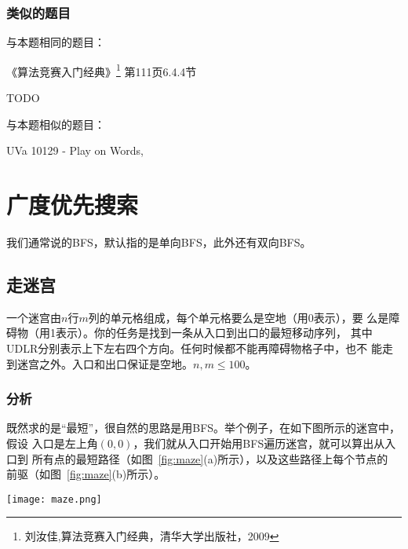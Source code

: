 \subsubsection{类似的题目}
与本题相同的题目：
\begindot
\item 《算法竞赛入门经典》\footnote{刘汝佳,算法竞赛入门经典，清华大学出版社，2009} 第111页6.4.4节
\item  TODO
\myenddot

与本题相似的题目：
\begindot
\item  UVa 10129 - Play on Words, 
\myenddot

\section{广度优先搜索} %

我们通常说的BFS，默认指的是单向BFS，此外还有双向BFS。

\subsection{走迷宫}
一个迷宫由$n$行$m$列的单元格组成，每个单元格要么是空地（用0表示），要
么是障碍物（用1表示）。你的任务是找到一条从入口到出口的最短移动序列，
其中UDLR分别表示上下左右四个方向。任何时候都不能再障碍物格子中，也不
能走到迷宫之外。入口和出口保证是空地。$n,m \leq 100$。

\subsubsection{分析}
既然求的是“最短”，很自然的思路是用BFS。举个例子，在如下图所示的迷宫中，假设
入口是左上角$(0,0)$，我们就从入口开始用BFS遍历迷宫，就可以算出从入口到
所有点的最短路径（如图~\ref{fig:maze}(a)所示），以及这些路径上每个节点的
前驱（如图~\ref{fig:maze}(b)所示）。

\begin{center}
\texttt{[image: maze.png]}\\
\label{fig:maze}
\end{center}

